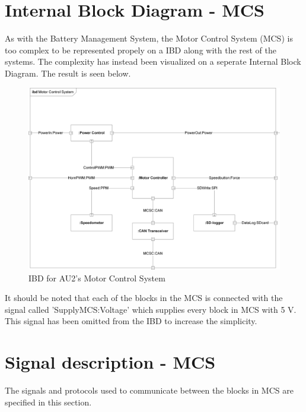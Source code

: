 \section{Internal Block Diagram - MCS}
As with the Battery Management System, the Motor Control System (MCS) is too complex to be represented propely on a IBD along with the rest of the systems. The complexity has instead been visualized on a seperate Internal Block Diagram. The result is seen below.

\begin{figure}[H]
	\centering
	\includegraphics[width=1\linewidth]{Architecture/Diagrams/IBD_MCS}
	\caption{IBD for AU2's Motor Control System}
	\label{fig:IBD_MCS}
\end{figure}

It should be noted that each of the blocks in the MCS is connected with the signal called 'SupplyMCS:Voltage' which supplies every block in MCS with 5 V. This signal has been omitted from the IBD to increase the simplicity.

\section{Signal description - MCS}
The signals and protocols used to communicate between the blocks in MCS are specified in this section.

